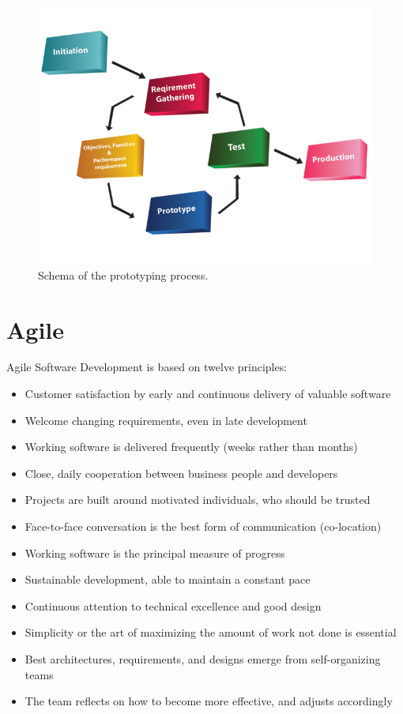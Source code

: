 \documentclass[12pt]{article}
\theoremstyle{definition}
\theoremstyle{definition}
\theoremstyle{remark}
\begin{document}
\begin{figure}
    \centering
    \includegraphics[scale=0.4]{prototyping.png}
    \caption{Schema of the prototyping process.}
    \label{Prototyping}
\end{figure}



\section{Agile}


Agile Software Development is based on twelve principles:~\cite{agile_manifesto:2018}

\begin{itemize}
\item Customer satisfaction by early and continuous delivery of valuable software
\item Welcome changing requirements, even in late development
\item Working software is delivered frequently (weeks rather than months)
\item Close, daily cooperation between business people and developers
\item Projects are built around motivated individuals, who should be trusted
\item Face-to-face conversation is the best form of communication (co-location)
\item Working software is the principal measure of progress
\item Sustainable development, able to maintain a constant pace
\item Continuous attention to technical excellence and good design
\item Simplicity or the art of maximizing the amount of work not done is essential
\item Best architectures, requirements, and designs emerge from self-organizing teams
\item The team reflects on how to become more effective, and adjusts accordingly
\end{itemize}
\end{document}

